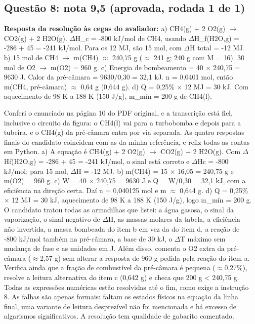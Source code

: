 \documentclass{article}%
\begin{document}
\subsection*{Questão 8: nota 9,5 (aprovada, rodada 1 de 1)}%
\textbf{Resposta da resolução às cegas do avaliador:} a) CH4(g) + 2 O2(g) $\to$ CO2(g) + 2 H2O(g). $\Delta$H\_c = -800 kJ/mol de CH4, usando $\Delta$H\_f(H2O,g) = -286 + 45 = -241 kJ/mol. Para os 12 MJ, são 15 mol, com $\Delta$H total = -12 MJ.\newline%
b) 15 mol de CH4 $\to$ m(CH4) $\approx$ 240,75 g ($\approx$ 241 g; 240 g com M = 16). 30 mol de O2 $\to$ m(O2) = 960 g.\newline%
c) Energia de bombeamento = 40 $\times$ 240,75 = 9630 J. Calor da pré{-}câmara = 9630/0,30 = 32,1 kJ. n = 0,0401 mol, então m(CH4, pré{-}câmara) $\approx$ 0,64 g (0,644 g).\newline%
d) Q = 0,25\% $\times$ 12 MJ = 30 kJ. Com aquecimento de 98 K a 188 K (150 J/g), m\_mín = 200 g de CH4(l).\par %
Conferi o enunciado na página 10 do PDF original, e a transcrição está fiel, inclusive o circuito da figura: o CH4(l) vai para a turbobomba e depois para a tubeira, e o CH4(g) da pré{-}câmara entra por via separada. As quatro respostas finais do candidato coincidem com as da minha referência, e refiz todas as contas em Python. a) A equação é CH4(g) + 2 O2(g) $\to$ CO2(g) + 2 H2O(g). Com $\Delta$Hf(H2O,g) = -286 + 45 = -241 kJ/mol, o sinal está correto e $\Delta$Hc = -800 kJ/mol; para 15 mol, $\Delta$H = -12 MJ. b) m(CH4) = 15 $\times$ 16,05 = 240,75 g e m(O2) = 960 g. c) W = 40 $\times$ 240,75 = 9630 J e Q = W/0,30 = 32,1 kJ, com a eficiência na direção certa. Daí n = 0,040125 mol e m $\approx$ 0,644 g. d) Q = 0,25\% $\times$ 12 MJ = 30 kJ, aquecimento de 98 K a 188 K (150 J/g), logo m\_mín = 200 g. O candidato tratou todas as armadilhas que listei: a água gasosa, o sinal da vaporização, o sinal negativo de $\Delta$H, as massas molares da tabela, a eficiência não invertida, a massa bombeada do item b em vez da do item d, a reação de -800 kJ/mol também na pré{-}câmara, a base de 30 kJ, o $\Delta$T máximo sem mudança de fase e as unidades em J. Além disso, comenta o O2 extra da pré{-}câmara ($\approx$2,57 g) sem alterar a resposta de 960 g pedida pela reação do item a. Verifica ainda que a fração de combustível da pré{-}câmara é pequena ($\approx$0,27\%), resolve a leitura alternativa do item c (0,642 g) e checa que 200 g < 240,75 g. Todas as expressões numéricas estão resolvidas até o fim, como exige a instrução 8. As falhas são apenas formais: faltam os estados físicos na equação da linha final, uma variante de leitura desprezível não foi mencionada e há excesso de algarismos significativos. A resolução tem qualidade de gabarito comentado.%
\end{document}
